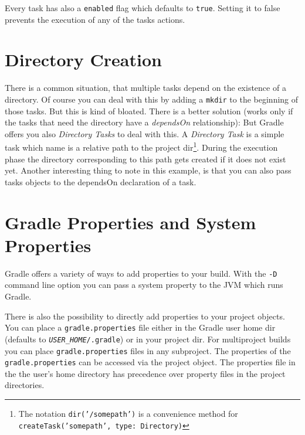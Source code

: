 Every task has also a \texttt{enabled} flag which defaults to \texttt{true}. Setting it to false prevents the execution of any of the tasks actions.

\section{Directory Creation} %
\label{sec:directory_creation}
There is a common situation, that multiple tasks depend on the existence of a directory. Of course you can deal with this by adding a \texttt{mkdir} to the beginning of those tasks. But this is kind of bloated. 
There is a better solution (works only if the tasks that need the directory have a \emph{dependsOn} relationship):
But Gradle offers you also \emph{Directory Tasks} to deal with this.
A \emph{Directory Task} is a simple task which name is a relative path to the project dir\footnote{The notation \texttt{dir('/somepath')} is a convenience method for \texttt{createTask('somepath', type: Directory)}}. During the execution phase the directory corresponding to this path gets created if it does not exist yet. Another interesting thing to note in this example, is that you can also pass tasks objects to the dependsOn declaration of a task.

\section{Gradle Properties and System Properties} %
\label{sec:gradle_properties_and_system_properties}
Gradle offers a variety of ways to add properties to your build. With the \texttt{-D} command line option you can pass a system property to the JVM which runs Gradle. 

There is also the possibility to directly add properties to your project objects. You can place a \texttt{gradle.properties} file either in the Gradle user home dir (defaults to \texttt{\emph{USER\_HOME}/.gradle}) or in your project dir. For multiproject builds you can place \texttt{gradle.properties} files in any subproject. The properties of the \texttt{gradle.properties} can be accessed via the project object. The properties file in the the user's home directory has precedence over property files in the project directories. 

